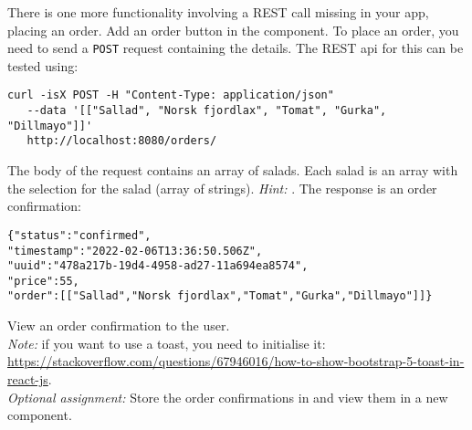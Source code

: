 \documentclass[fleqn, article, a4paper]{memoir}
\begin{document}
\begin{Assignments}
\item There is one more functionality involving a REST call missing in your app, placing an order. Add an order button in the  component. To place an order, you need to send a \texttt{POST} request containing the details. The REST api for this can be tested using:
\\ \noindent \begin{verbatim}
curl -isX POST -H "Content-Type: application/json" 
   --data '[["Sallad", "Norsk fjordlax", "Tomat", "Gurka", "Dillmayo"]]'
   http://localhost:8080/orders/
\end{verbatim}
\noindent The body of the request contains an array of salads. Each salad is an array with the selection for the salad (array of strings). \emph{Hint:} . The response is an order confirmation:
\begin{verbatim}
{"status":"confirmed",
"timestamp":"2022-02-06T13:36:50.506Z",
"uuid":"478a217b-19d4-4958-ad27-11a694ea8574",
"price":55,
"order":[["Sallad","Norsk fjordlax","Tomat","Gurka","Dillmayo"]]}
\end{verbatim}
\noindent View an order confirmation to the user.
\\\emph{Note:} if you want to use a toast, you need to initialise it: \url{https://stackoverflow.com/questions/67946016/how-to-show-bootstrap-5-toast-in-react-js}. 
\\\emph{Optional assignment:} Store the order confirmations in  and view them in a new component.


\end{Assignments}
\end{document}
